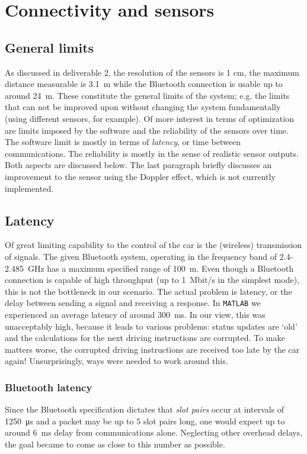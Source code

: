\documentclass[11pt,titlepage]{report}
\begin{document}
\chapter{Connectivity and sensors}
\label{ch:anticollision}
\section{General limits}
As discussed in deliverable 2, the resolution of the sensors is 1 cm, the maximum distance measurable is \SI{3.1}{m} while the Bluetooth connection is usable up to around \SI{24}{m}. These constitute the general limits of the system; e.g. the limits that can not be improved upon without changing the system fundamentally (using different sensors, for example). Of more interest in terms of optimization are limits imposed by the software and the reliability of the sensors over time. The software limit is mostly in terms of \textit{latency}, or time between communications. The reliability is mostly in the sense of realistic sensor outputs. Both aspects are discussed below. The last paragraph briefly discusses an improvement to the sensor using the Doppler effect, which is not currently implemented.

\section{Latency}
Of great limiting capability to the control of the car is the (wireless) transmission of signals. The given Bluetooth system, operating in the frequency band of \num{2.4}-\SI{2.485}{GHz} has a maximum specified range of \SI{100}{m}.  Even though a Bluetooth connection is capable of high throughput (up to \SI{1}{Mbit/s} in the simplest mode), this is not the bottleneck in our scenario. The actual problem is latency, or the delay between sending a signal and receiving a response. In \texttt{MATLAB} we experienced an average latency of around \SI{300}{ms}. In our view, this was unacceptably high, because it leads to various problems: status updates are `old' and the calculations for the next driving instructions are corrupted. To make matters worse, the corrupted driving instructions are received too late by the car again! Unsurprisingly, ways were needed to work around this.
\subsection{Bluetooth latency}
Since the Bluetooth specification dictates that \textit{slot pairs} occur at intervals of \SI{1250}{\micro s} and a packet may be up to 5 slot pairs long, one would expect up to around \SI{6}{ms} delay from communications alone. Neglecting other overhead delays, the goal became to come as close to this number as possible. 
\end{document}
